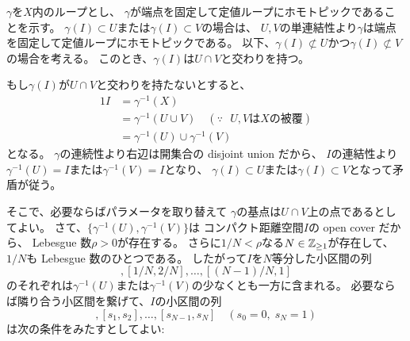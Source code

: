 \documentclass[report]{jlreq}
\begin{document}

\begin{answer}
    $\gamma$を$X$内のループとし、
    $\gamma$が端点を固定して定値ループにホモトピックであることを示す。
    $\gamma(I) \subset U$または$\gamma(I) \subset V$の場合は、
    $U, V$の単連結性より$\gamma$は端点を固定して定値ループにホモトピックである。
    以下、$\gamma(I) \not\subset U$かつ$\gamma(I) \not\subset V$の場合を考える。
    このとき、$\gamma(I)$は$U \cap V$と交わりを持つ。
    \begin{innerproof}
        もし$\gamma(I)$が$U \cap V$と交わりを持たないとすると、
        \begin{alignat}{1}
            I &= \gamma^{-1}(X) \\
                &= \gamma^{-1}(U \cup V)
                \quad (\because \text{ $U, V$は$X$の被覆}) \\
                &= \gamma^{-1}(U) \cup \gamma^{-1}(V)
        \end{alignat}
        となる。
        $\gamma$の連続性より右辺は開集合の disjoint union だから、
        $I$の連結性より$\gamma^{-1}(U) = I$または$\gamma^{-1}(V) = I$となり、
        $\gamma(I) \subset U$または$\gamma(I) \subset V$となって矛盾が従う。
    \end{innerproof}
    そこで、必要ならばパラメータを取り替えて
    $\gamma$の基点は$U \cap V$上の点であるとしてよい。
    さて、$\{ \gamma^{-1}(U), \gamma^{-1}(V) \}$は
    コンパクト距離空間$I$の open cover だから、
    Lebesgue 数$\rho > 0$が存在する。
    さらに$1/N < \rho$なる$N \in \mathbb{Z}_{\ge 1}$が存在して、
    $1/N$も Lebesgue 数のひとつである。
    したがって$I$を$N$等分した小区間の列
    \begin{equation}
        [0, 1/N], [1/N, 2/N], \dots, [(N - 1) / N, 1]
    \end{equation}
    のそれぞれは$\gamma^{-1}(U)$または$\gamma^{-1}(V)$の少なくとも一方に含まれる。
    必要ならば隣り合う小区間を繋げて、$I$の小区間の列
    \begin{equation}
        [s_0, s_1], [s_1, s_2], \dots, [s_{N - 1}, s_N]
        \quad
        (s_0 = 0, \; s_N = 1)
    \end{equation}
    は次の条件をみたすとしてよい:

\end{answer}
\end{document}

